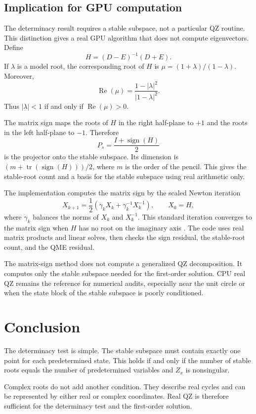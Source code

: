 \documentclass[11pt]{article}
\begin{document}
\subsection{Implication for GPU computation}

The determinacy result requires a stable subspace, not a particular QZ routine.
This distinction gives a real GPU algorithm that does not compute eigenvectors.
Define
\[
    H=(D-E)^{-1}(D+E).
\]
If $\lambda$ is a model root, the corresponding root of $H$ is
$\mu=(1+\lambda)/(1-\lambda)$. Moreover,
\[
    \operatorname{Re}(\mu)
    =\frac{1-|\lambda|^2}{|1-\lambda|^2}.
\]
Thus $|\lambda|<1$ if and only if $\operatorname{Re}(\mu)>0$.

The matrix sign maps the roots of $H$ in the right half-plane to $+1$ and the
roots in the left half-plane to $-1$. Therefore
\[
    P_s=\frac{I+\operatorname{sign}(H)}{2}
\]
is the projector onto the stable subspace. Its dimension is
$(m+\operatorname{tr}(\operatorname{sign}(H)))/2$, where $m$ is the order of
the pencil. This gives the stable-root count and a basis for the stable
subspace using real arithmetic only.

The implementation computes the matrix sign by the scaled Newton iteration
\[
    X_{k+1}=\frac{1}{2}
    \left(\gamma_kX_k+\gamma_k^{-1}X_k^{-1}\right),
    \qquad X_0=H,
\]
where $\gamma_k$ balances the norms of $X_k$ and $X_k^{-1}$. This standard
iteration converges to the matrix sign when $H$ has no root on the imaginary
axis \cite{byers1997}. The code uses real matrix products and linear solves,
then checks the sign residual, the stable-root count, and the QME residual.

The matrix-sign method does not compute a generalized QZ decomposition. It
computes only the stable subspace needed for the first-order solution. CPU real
QZ remains the reference for numerical audits, especially near the unit circle
or when the state block of the stable subspace is poorly conditioned.

\section{Conclusion}

The determinacy test is simple. The stable subspace must contain exactly one
point for each predetermined state. This holds if and only if the number of
stable roots equals the number of predetermined variables and $Z_x$ is
nonsingular.

Complex roots do not add another condition. They describe real cycles and can
be represented by either real or complex coordinates. Real QZ is therefore
sufficient for the determinacy test and the first-order solution.
\end{document}
